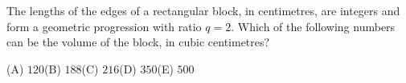 The lengths of the edges of a rectangular block, in centimetres, are integers and form a geometric progression with ratio $q=2$. Which of the following numbers can be the volume of the block, in cubic centimetres?

(A) $120$\quad (B) $188$\quad (C) $216$\quad (D) $350$\quad (E) $500$

